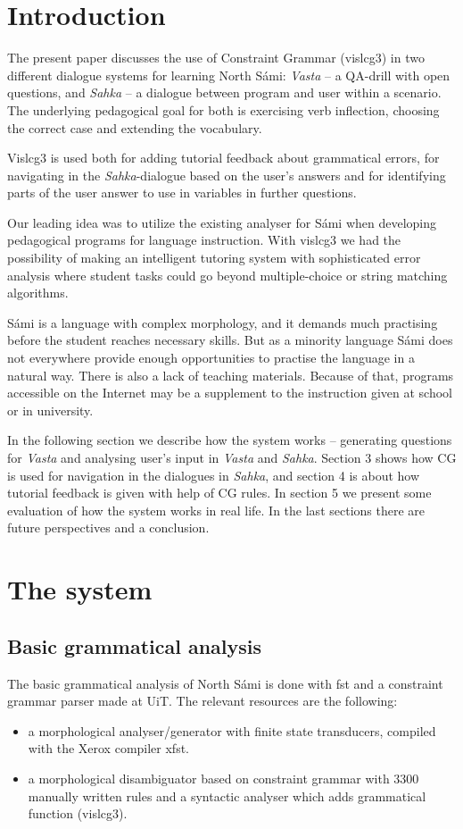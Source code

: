 \documentclass[11pt]{article}
\begin{document}
\section{Introduction} 

The present paper discusses the use of Constraint Grammar (vislcg3) in two different dialogue systems for learning North Sámi: \textit{Vasta} -- a QA-drill with open questions, and \textit{Sahka} -- a  dialogue between program and user within a scenario. The underlying pedagogical goal for both is exercising verb inflection, choosing the correct case and extending the vocabulary. 

Vislcg3 is used both for adding tutorial feedback about grammatical errors, for navigating in the \textit{Sahka}-dialogue based on the user's answers and for identifying parts of the user answer to use in variables in further questions. 

Our leading idea was to utilize the existing analyser for Sámi when developing pedagogical programs for language instruction. With vislcg3 we had the possibility of making an intelligent tutoring system with sophisticated error analysis where student tasks could go beyond multiple-choice or string matching algorithms. 

Sámi is a language with complex morphology, and it demands much practising before the student reaches necessary skills. But as a minority language Sámi does not everywhere provide enough opportunities to practise the language in a natural way. There is also a lack of teaching materials. Because of that, programs accessible on the Internet may be a supplement to the instruction given at school or in university. 

In the following section we describe how the system works -- generating questions for \textit{Vasta} and analysing user's input in \textit{Vasta} and \textit{Sahka}. Section 3 shows how CG is used for navigation in the dialogues in \textit{Sahka}, and section 4 is about how tutorial feedback is given with help of CG rules. In section 5 we present some evaluation of how the system works in real life. In the last sections there are future perspectives and a conclusion.

\section{The system}
\subsection{Basic grammatical analysis}
The basic grammatical analysis of North Sámi is done with fst and a constraint grammar parser made at UiT. The relevant resources are the following:
\begin{itemize}
\item a morphological analyser/generator with finite state transducers, compiled with the Xerox compiler xfst.  
\item a morphological disambiguator based on constraint grammar with 3300 manually written rules and a syntactic analyser which adds grammatical function (vislcg3). 
\end{itemize} 
\end{document}
